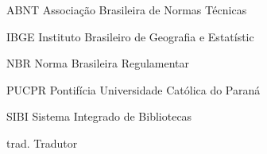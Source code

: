 
\begin{siglas}
	\item[ABNT] Associação Brasileira de Normas Técnicas
	\item[IBGE] Instituto Brasileiro de Geografia e Estatístic
	\item[NBR] Norma Brasileira Regulamentar 
	\item[PUCPR] Pontifícia Universidade Católica do Paraná
    \item[SIBI] Sistema Integrado de Bibliotecas 
    \item[trad.] Tradutor 
\end{siglas}

